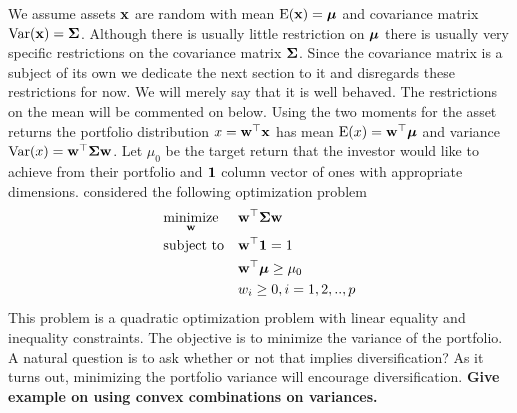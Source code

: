 \documentclass[]{book}\usepackage{knitr}
\begin{document}
We assume assets $\mathbf{x}$ are random with mean $\operatorname{E}(\mathbf{x})=\mbox{\boldmath$\mu$}$ and covariance matrix $\operatorname{Var}(\mathbf{x})=\mathbf{\Sigma}$. Although there is usually little restriction on $\mbox{\boldmath$\mu$}$ there is usually very specific restrictions on the covariance matrix $\mathbf{\Sigma}$. Since the covariance matrix is a subject of its own we dedicate the next section to it and disregards these restrictions for now. We will merely say that it is well behaved. The restrictions on the mean will be commented on below. Using the two moments for the asset returns the portfolio distribution $x = \mathbf{w}^\top \mathbf{x}$ has mean $\operatorname{E}(x)=\mathbf{w}^\top \mbox{\boldmath$\mu$}$ and variance $\operatorname{Var}(x)=\mathbf{w}^\top \mathbf{\Sigma} \mathbf{w}$. Let $\mu_0$ be the target return that the investor would like to achieve from their portfolio and $\mathbf{1}$ column vector of ones with appropriate dimensions. \citet{markowitz1959portfolio} considered the following optimization problem
\begin{equation}\label{eqn:markowitz_optim}
\begin{aligned}
& \underset{\mathbf{w}}{\text{minimize}} 
& & \mathbf{w}^\top \mathbf{\Sigma} \mathbf{w} \\
& \text{subject to}
& & \mathbf{w}^\top \mathbf{1} = 1 \\
& && \mathbf{w}^\top \mbox{\boldmath$\mu$} \geq \mu_0 \\
&&& w_i \geq 0, i=1,2,..,p
\end{aligned}
\end{equation}
This problem is a quadratic optimization problem with linear equality and inequality constraints. 
The objective is to minimize the variance of the portfolio. 
A natural question is to ask whether or not that implies diversification? As it turns out, minimizing the portfolio variance will encourage diversification.
\textbf{Give example on using convex combinations on variances.} 
 
\end{document}
